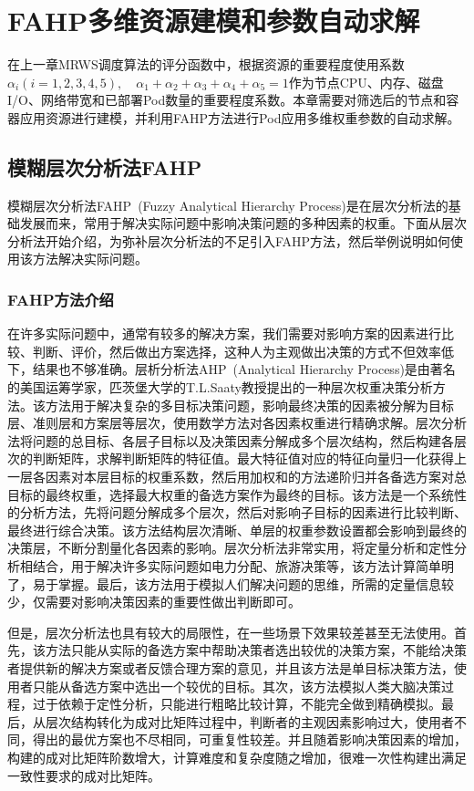 \chapter{FAHP多维资源建模和参数自动求解}
在上一章MRWS调度算法的评分函数中，根据资源的重要程度使用系数$\alpha_{i}(i=1,2,3,4,5), \quad\alpha_{1}+\alpha_{2}+\alpha_{3}+\alpha_{4}+\alpha_{5}=1$作为节点CPU、内存、磁盘I/O、网络带宽和已部署Pod数量的重要程度系数。本章需要对筛选后的节点和容器应用资源进行建模，并利用FAHP方法进行Pod应用多维权重参数的自动求解。

\section{模糊层次分析法FAHP}
模糊层次分析法FAHP~\cite{Kwong2002A,Hong2013Cloud}(Fuzzy Analytical Hierarchy Process)是在层次分析法的基础发展而来，常用于解决实际问题中影响决策问题的多种因素的权重。下面从层次分析法开始介绍，为弥补层次分析法的不足引入FAHP方法，然后举例说明如何使用该方法解决实际问题。

\subsection{FAHP方法介绍}
在许多实际问题中，通常有较多的解决方案，我们需要对影响方案的因素进行比较、判断、评价，然后做出方案选择，这种人为主观做出决策的方式不但效率低下，结果也不够准确。层析分析法AHP~\cite{Saaty1994How,Deng2012}(Analytical Hierarchy Process)是由著名的美国运筹学家，匹茨堡大学的T.L.Saaty教授提出的一种层次权重决策分析方法。该方法用于解决复杂的多目标决策问题，影响最终决策的因素被分解为目标层、准则层和方案层等层次，使用数学方法对各因素权重进行精确求解。层次分析法将问题的总目标、各层子目标以及决策因素分解成多个层次结构，然后构建各层次的判断矩阵，求解判断矩阵的特征值。最大特征值对应的特征向量归一化获得上一层各因素对本层目标的权重系数，然后用加权和的方法递阶归并各备选方案对总目标的最终权重，选择最大权重的备选方案作为最终的目标。该方法是一个系统性的分析方法，先将问题分解成多个层次，然后对影响子目标的因素进行比较判断、最终进行综合决策。该方法结构层次清晰、单层的权重参数设置都会影响到最终的决策层，不断分割量化各因素的影响。层次分析法非常实用，将定量分析和定性分析相结合，用于解决许多实际问题如电力分配、旅游决策等，该方法计算简单明了，易于掌握。最后，该方法用于模拟人们解决问题的思维，所需的定量信息较少，仅需要对影响决策因素的重要性做出判断即可。

但是，层次分析法也具有较大的局限性，在一些场景下效果较差甚至无法使用。首先，该方法只能从实际的备选方案中帮助决策者选出较优的决策方案，不能给决策者提供新的解决方案或者反馈合理方案的意见，并且该方法是单目标决策方法，使用者只能从备选方案中选出一个较优的目标。其次，该方法模拟人类大脑决策过程，过于依赖于定性分析，只能进行粗略比较计算，不能完全做到精确模拟。最后，从层次结构转化为成对比矩阵过程中，判断者的主观因素影响过大，使用者不同，得出的最优方案也不尽相同，可重复性较差。并且随着影响决策因素的增加，构建的成对比矩阵阶数增大，计算难度和复杂度随之增加，很难一次性构建出满足一致性要求的成对比矩阵。

